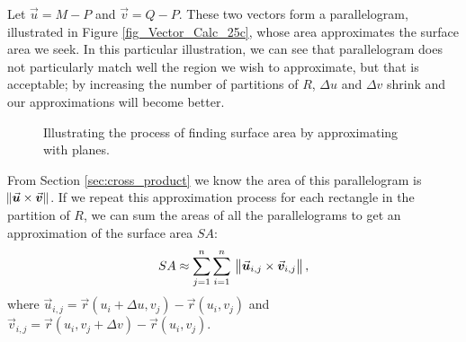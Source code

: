 Let $\vec u = M-P$ and $\vec v = Q-P$. These two vectors form a parallelogram, illustrated in Figure \ref{fig_Vector_Calc_25c}, whose area approximates the surface area we seek. In this particular illustration, we can see that parallelogram does not particularly match well the region we wish to approximate, but that is acceptable; by increasing the number of partitions of $R$, $\Delta u$ and $\Delta v$ shrink and our approximations will become better.


\begin{figure}[H]
\centering
\qquad
{}
\qquad
{}
\caption{Illustrating the process of finding surface area by approximating with planes.}
\end{figure}


From Section \ref{sec:cross_product} we know the area of this parallelogram is $\norm{\vec u\times \vec v}$. If we repeat this approximation process for each rectangle in the partition of $R$, we can sum the areas of all the parallelograms to get an approximation of the surface area $SA$:
$$SA \approx \sum_{j=1}^n\sum_{i=1}^n \ \norm{\vec u_{i,j}\times \vec v_{i,j}},$$
where $\vec u_{i,j} = \vec r(u_i+\Delta u,v_j) - \vec r(u_i,v_j)$ and $\vec v_{i,j} = \vec r(u_i,v_j+\Delta v)-\vec r(u_i,v_j)$.


